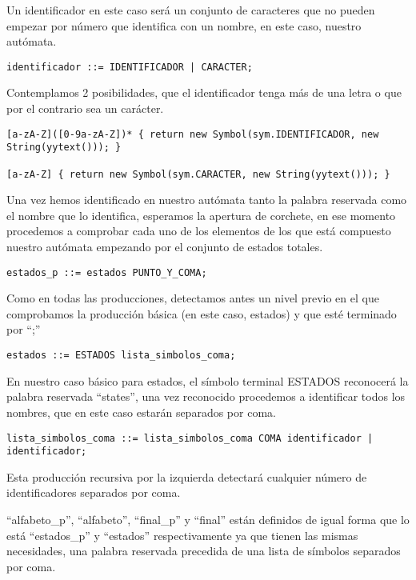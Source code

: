 \documentclass{llncs}
\begin{document}
Un identificador en este caso será un conjunto de caracteres que no pueden empezar por número que identifica con un nombre, en este caso, nuestro autómata.


\begin{verbatim}
identificador ::= IDENTIFICADOR | CARACTER;
\end{verbatim} 

Contemplamos 2 posibilidades, que el identificador tenga más de una letra o que por el contrario sea un carácter.

\begin{verbatim}
[a-zA-Z]([0-9a-zA-Z])* { return new Symbol(sym.IDENTIFICADOR, new String(yytext())); }

[a-zA-Z] { return new Symbol(sym.CARACTER, new String(yytext())); }
\end{verbatim} 

Una vez hemos identificado en nuestro autómata tanto la palabra reservada como el nombre que lo identifica, esperamos la apertura de corchete, en ese momento procedemos a comprobar cada uno de los elementos de los que está compuesto nuestro autómata empezando por el conjunto de estados totales.

\begin{verbatim}
estados_p ::= estados PUNTO_Y_COMA;
\end{verbatim} 

Como en todas las producciones, detectamos antes un nivel previo en el que comprobamos la producción básica (en este caso, estados) y que esté terminado por “;”

\begin{verbatim}
estados ::= ESTADOS lista_simbolos_coma;
\end{verbatim} 

En nuestro caso básico para estados, el símbolo terminal ESTADOS reconocerá la palabra reservada “states”, una vez reconocido procedemos a identificar todos los nombres, que en este caso estarán separados por coma.

\begin{verbatim}
lista_simbolos_coma ::= lista_simbolos_coma COMA identificador | identificador;
\end{verbatim} 

Esta producción recursiva por la izquierda detectará cualquier número de identificadores separados por coma.

“alfabeto\_p”, “alfabeto”, “final\_p” y “final” están definidos de igual forma que lo está “estados\_p” y “estados” respectivamente ya que tienen las mismas necesidades, una palabra reservada precedida de una lista de símbolos separados por coma.
\end{document}
